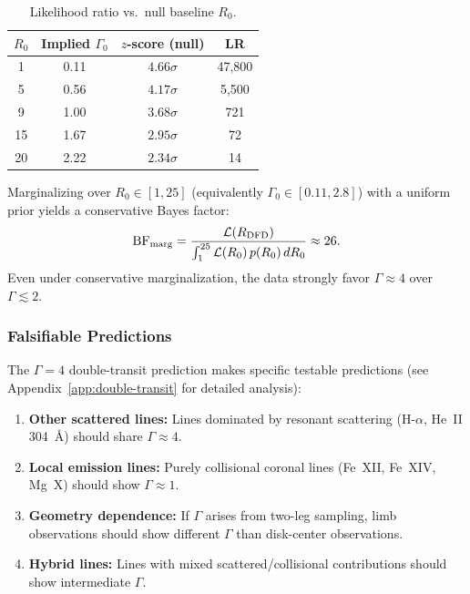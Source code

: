 \begin{table}[h]
\centering
\caption{Likelihood ratio vs.\ null baseline $R_0$.}\label{tab:null-robustness}
\begin{ruledtabular}
\begin{tabular}{cccc}
$R_0$ & Implied $\Gamma_0$ & $z$-score (null) & LR \\
\hline
1 & 0.11 & $4.66\sigma$ & 47,800 \\
5 & 0.56 & $4.17\sigma$ & 5,500 \\
9 & 1.00 & $3.68\sigma$ & 721 \\
15 & 1.67 & $2.95\sigma$ & 72 \\
20 & 2.22 & $2.34\sigma$ & 14 \\
\end{tabular}
\end{ruledtabular}
\end{table}

Marginalizing over $R_0 \in [1, 25]$ (equivalently $\Gamma_0 \in [0.11, 2.8]$) with a 
uniform prior yields a conservative Bayes factor:
\begin{equation}
\mathrm{BF}_{\rm marg} = \frac{\mathcal{L}(R_{\rm DFD})}{\int_{1}^{25} \mathcal{L}(R_0)\, p(R_0)\, dR_0} \approx 26.
\end{equation}
Even under conservative marginalization, the data strongly favor $\Gamma \approx 4$ 
over $\Gamma \lesssim 2$.

\subsubsection{Falsifiable Predictions}

The $\Gamma = 4$ double-transit prediction makes specific testable predictions 
(see Appendix~\ref{app:double-transit} for detailed analysis):

\begin{enumerate}[nosep]
\item \textbf{Other scattered lines:} Lines dominated by resonant scattering 
(H-$\alpha$, He~II 304~\AA) should share $\Gamma \approx 4$.
\item \textbf{Local emission lines:} Purely collisional coronal lines 
(Fe~XII, Fe~XIV, Mg~X) should show $\Gamma \approx 1$.
\item \textbf{Geometry dependence:} If $\Gamma$ arises from two-leg sampling, 
limb observations should show different $\Gamma$ than disk-center observations.
\item \textbf{Hybrid lines:} Lines with mixed scattered/collisional contributions 
should show intermediate $\Gamma$.
\end{enumerate}


